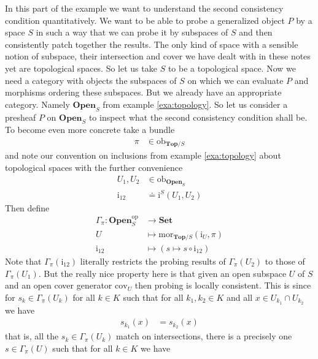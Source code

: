 \begin{exa}
\label{exa:gs2}
In this part of the example we want to understand the second consistency condition quantitatively. We want to be able to probe a generalized object $P$ by a space $S$ in such a way that we can probe it by subspaces of $S$ and then consistently patch together the results. The only kind of space with a sensible notion of subspace, their intersection and cover we have dealt with in these notes yet are topological spaces. So let us take $S$ to be a topological space. Now we need a category with objects the subspaces of $S$ on which we can evaluate $P$ and morphisms ordering these subspaces. But we already have an appropriate category. Namely $\mathbf{Open}_{S}$ from example \ref{exa:topology}. So let us consider a presheaf $P$ on $\mathbf{Open}_{S}$ to inspect what the second consistency condition shall be. To become even more concrete take a bundle
\begin{align*}
  \pi
  &\in
  \mathrm{ob}_{\mathbf{Top} \slash S}
\end{align*}
and note our convention on inclusions from example \ref{exa:topology} about topological spaces with the further convenience
\begin{align*}
  U_{1},
  U_{2}
  &\in
  \mathrm{ob}_{\mathbf{Open}_{S}}
  \\
  \mathrm{i}_{12}
  &\doteq
  \mathrm{i}^{S}(U_{1},U_{2})
\end{align*}
Then define
\begin{align*}
  \Gamma_{\pi}
  \colon
  \mathbf{Open}_{S}^{\mathrm{op}}
  &\rightarrow
  \mathbf{Set}
  \\
  U
  &\mapsto
  \mathrm{mor}_{\mathbf{Top} \slash S}(\mathrm{i}_{U},\pi)
  \\
  \mathrm{i}_{12}
  &\mapsto
  (s \mapsto s \circ \mathrm{i}_{12})
\end{align*}
Note that $\Gamma_{\pi}(\mathrm{i}_{12})$ literally restricts the probing results of $\Gamma_{\pi}(U_{2})$ to those of $\Gamma_{\pi}(U_{1})$. But the really nice property here is that given an open subspace $U$ of $S$ and an open cover generator $\mathrm{cov}_{U}$ then probing is locally consistent. This is since for $s_{k} \in \Gamma_{\pi}(U_{k})$ for all $k \in K$ such that for all $k_{1},k_{2} \in K$ and all $x \in U_{k_{1}} \cap U_{k_{2}}$ we have
\begin{align*}
  s_{k_{1}}(x)
  &=
  s_{k_{2}}(x)
\end{align*}
that is, all the $s_{k} \in \Gamma_{\pi}(U_{k})$ match on intersections, there is a precisely one $s \in \Gamma_{\pi}(U)$ such that for all $k \in K$ we have

\end{exa}
